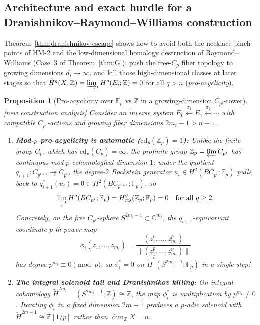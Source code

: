 \documentclass[11pt]{article}
\newtheorem{proposition}[theorem]{Proposition}
\theoremstyle{definition}
\newcommand{\status}[1]{\textit{\textcolor{black!70}{[#1]}}}
\begin{document}
\subsection{Architecture and exact hurdle for a Dranishnikov--Raymond--Williams construction}
\label{sec:drw-blueprint}

Theorem~\ref{thm:dranishnikov-escape} shows how to avoid both the necklace
pinch points of HM-2 and the low-dimensional homology destruction of
Raymond--Williams (Case~3 of Theorem~\ref{thm:G}): push the free-$C_p$ fiber
topology to growing dimensions $d_i\to\infty$, and kill those high-dimensional
classes at later stages so that $\check{H}^q(X;\mathbb{Z})=\varinjlim_i H^q(E_i;\mathbb{Z})=0$
for all $q>n$ (\emph{pro-acyclicity}).

\begin{proposition}[Pro-acyclicity over $\mathbb{F}_p$ vs $\mathbb{Z}$ in a growing-dimension $C_{p^i}$-tower]
\label{prop:drw-blueprint}
\status{new construction analysis}
Consider an inverse system $E_0\xleftarrow{\pi_1}E_1\xleftarrow{\pi_2}\cdots$
with compatible $C_{p^i}$-actions and growing fiber dimensions
$2m_i-1 > n+1$.
\begin{enumerate}[label=(\alph*)]
\item \textbf{Mod-$p$ pro-acyclicity is automatic ($\mathrm{cd}_p(\mathbb{Z}_p)=1$):}
Unlike the finite group $C_p$, which has $\mathrm{cd}_p(C_p)=\infty$, the
profinite group $\mathbb{Z}_p=\varprojlim C_{p^i}$ has continuous mod-$p$
cohomological dimension $1$: under the quotient $q_{i+1}:C_{p^{i+1}}\twoheadrightarrow C_{p^i}$,
the degree-$2$ Bockstein generator $u_i\in H^2(BC_{p^i};\mathbb{F}_p)$ pulls
back to $q_{i+1}^*(u_i)=0\in H^2(BC_{p^{i+1}};\mathbb{F}_p)$, so
\[
\varinjlim_i H^q(BC_{p^i};\mathbb{F}_p) = H^q_{\mathrm{cts}}(\mathbb{Z}_p;\mathbb{F}_p) = 0
\quad \text{for all } q\ge 2.
\]
Concretely, on the free $C_{p^i}$-sphere $S^{2m_i-1}\subset\mathbb{C}^{m_i}$,
the $q_{i+1}$-equivariant coordinate $p$-th power map
\[
\phi_i(z_1,\dots,z_{m_i}) = \frac{(z_1^p,\dots,z_{m_i}^p)}{\|(z_1^p,\dots,z_{m_i}^p)\|}
\]
has degree $p^{m_i}\equiv 0\pmod{p}$, so $\phi_i^*=0$ on
$\tilde{H}^*(S^{2m_i-1};\mathbb{F}_p)$ in a single step!
\item \textbf{The integral solenoid tail and Dranishnikov killing:}
On integral cohomology $\tilde{H}^{2m_i-1}(S^{2m_i-1};\mathbb{Z})\cong\mathbb{Z}$,
the map $\phi_i^*$ is multiplication by $p^{m_i}\neq 0$.  Iterating $\phi_i$ in
a \emph{fixed} dimension $2m-1$ produces a $p$-adic solenoid with
$\check{H}^{2m-1}\cong\mathbb{Z}[1/p]$ rather than $\dim_{\mathbb{Z}}X=n$.

\end{enumerate}
\end{proposition}
\end{document}
